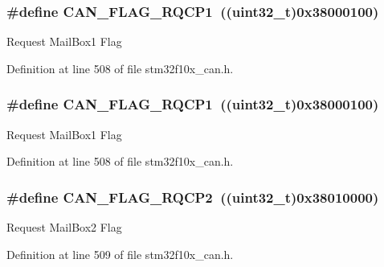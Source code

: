 \subsubsection[{\texorpdfstring{C\+A\+N\+\_\+\+F\+L\+A\+G\+\_\+\+R\+Q\+C\+P1}{CAN_FLAG_RQCP1}}]{\setlength{\rightskip}{0pt plus 5cm}\#define C\+A\+N\+\_\+\+F\+L\+A\+G\+\_\+\+R\+Q\+C\+P1~(({\bf uint32\+\_\+t})0x38000100)}\hypertarget{group___c_a_n__flags_gaba705586ebc3d961507436c03a2feaba}{}\label{group___c_a_n__flags_gaba705586ebc3d961507436c03a2feaba}
Request Mail\+Box1 Flag 

Definition at line 508 of file stm32f10x\+\_\+can.\+h.

\subsubsection[{\texorpdfstring{C\+A\+N\+\_\+\+F\+L\+A\+G\+\_\+\+R\+Q\+C\+P1}{CAN_FLAG_RQCP1}}]{\setlength{\rightskip}{0pt plus 5cm}\#define C\+A\+N\+\_\+\+F\+L\+A\+G\+\_\+\+R\+Q\+C\+P1~(({\bf uint32\+\_\+t})0x38000100)}\hypertarget{group___c_a_n__flags_gaba705586ebc3d961507436c03a2feaba}{}\label{group___c_a_n__flags_gaba705586ebc3d961507436c03a2feaba}
Request Mail\+Box1 Flag 

Definition at line 508 of file stm32f10x\+\_\+can.\+h.

\subsubsection[{\texorpdfstring{C\+A\+N\+\_\+\+F\+L\+A\+G\+\_\+\+R\+Q\+C\+P2}{CAN_FLAG_RQCP2}}]{\setlength{\rightskip}{0pt plus 5cm}\#define C\+A\+N\+\_\+\+F\+L\+A\+G\+\_\+\+R\+Q\+C\+P2~(({\bf uint32\+\_\+t})0x38010000)}\hypertarget{group___c_a_n__flags_ga9c20cd47e558135bd7ae71149583d487}{}\label{group___c_a_n__flags_ga9c20cd47e558135bd7ae71149583d487}
Request Mail\+Box2 Flag 

Definition at line 509 of file stm32f10x\+\_\+can.\+h.

